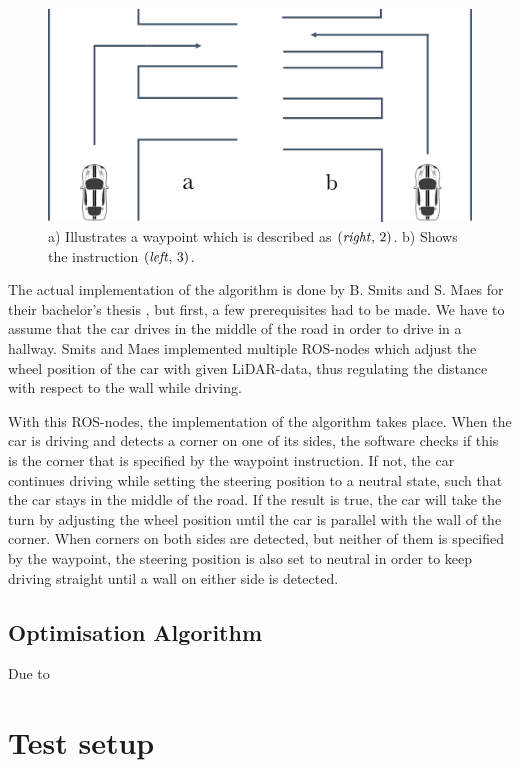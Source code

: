 \documentclass[conference,a4paper]{IEEEtran}
\begin{document}
\begin{figure}[!t]
	\includegraphics[width=\columnwidth]{waypoints_turns}
	\centering
	\caption{a) Illustrates a waypoint which is described as $(\text{\emph{right}},\,2)$. b) Shows the instruction $(\text{\emph{left}},\,3)$. }
	\label{fig:waypoints_turns}
\end{figure}

The actual implementation of the algorithm is done by B. Smits and S. Maes for their bachelor's thesis \cite{SmitsMaes2017}, but first, a few prerequisites had to be made. We have to assume that the car drives in the middle of the road in order to drive in a hallway. Smits and Maes implemented multiple ROS-nodes which adjust the wheel position of the car with given LiDAR-data, thus regulating the distance with respect to the wall while driving. 

With this ROS-nodes, the implementation of the algorithm takes place. When the car is driving and detects a corner on one of its sides, the software checks if this is the corner that is specified by the waypoint instruction. If not, the car continues driving while setting the steering position to a neutral state, such that the car stays in the middle of the road. If the result is true, the car will take the turn by adjusting the wheel position until the car is parallel with the wall of the corner. When corners on both sides are detected, but neither of them is specified by the waypoint, the steering position is also set to neutral in order to keep driving straight until a wall on either side is detected.

\subsection{Optimisation Algorithm}
Due to 

\section{Test setup}
\label{sec:TestSetup}
\end{document}
